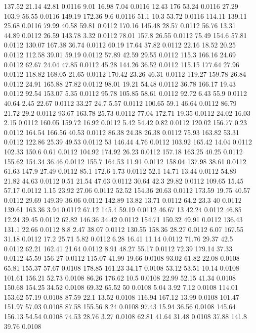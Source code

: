 137.52	21.14	42.81	0.0116
9.01	16.98	7.04	0.0116
12.43	176	53.24	0.0116
27.29	103.9	56.55	0.0116
149.19	172.36	9.6	0.0116
51.1	10.3	53.72	0.0116
114.11	139.11	25.68	0.0116
79.99	40.58	59.81	0.0112
170.16	145.48	28.57	0.0112
56.76	13.31	44.89	0.0112
26.59	143.78	3.32	0.0112
78.01	157.8	26.55	0.0112
75.49	154.6	57.81	0.0112
130.07	167.38	36.74	0.0112
60.19	17.64	37.82	0.0112
22.16	18.52	20.25	0.0112
112.58	39.01	59.19	0.0112
57.89	42.59	29.55	0.0112
115.3	166.16	24.69	0.0112
62.67	24.04	47.85	0.0112
45.28	144.26	36.52	0.0112
115.15	177.64	27.96	0.0112
118.82	168.05	21.65	0.0112
170.42	23.26	46.31	0.0112
119.27	159.78	26.84	0.0112
24.91	165.88	27.82	0.0112
98.01	19.21	54.48	0.0112
36.78	166.17	19.43	0.0112
92.54	153.07	5.35	0.0112
95.78	105.85	58.61	0.0112
92.72	6.43	55.9	0.0112
40.64	2.45	22.67	0.0112
33.27	24.7	5.57	0.0112
100.65	59.1	46.64	0.0112
86.79	21.72	29.2	0.0112
93.67	163.78	25.73	0.0112
77.04	172.71	19.35	0.0112
24.02	16.03	2.15	0.0112
160.05	159.72	16.92	0.0112
5.42	54.42	0.82	0.0112
120.02	156.77	0.23	0.0112
164.54	166.56	40.53	0.0112
86.38	24.38	26.38	0.0112
75.93	163.82	53.31	0.0112
122.86	25.39	49.53	0.0112
53	146.44	4.76	0.0112
103.92	165.42	14.04	0.0112
102.33	150.6	0.61	0.0112
104.92	174.92	26.23	0.0112
157.18	163.25	40.25	0.0112
155.62	154.34	36.46	0.0112
155.7	164.53	11.91	0.0112
158.04	137.98	38.61	0.0112
61.63	147.9	27.49	0.0112
85.1	172.6	1.73	0.0112
52.1	14.71	13.44	0.0112
54.89	21.82	44.63	0.0112
0.51	21.54	47.63	0.0112
30.64	42.3	29.82	0.0112
109.65	15.45	57.17	0.0112
1.15	23.92	27.06	0.0112
52.52	154.36	20.63	0.0112
173.59	19.75	40.57	0.0112
29.69	149.39	36.06	0.0112
142.89	13.82	13.71	0.0112
64.2	23.3	40	0.0112
139.61	163.36	3.94	0.0112
67.12	145.4	59.19	0.0112
46.67	13	42.24	0.0112
46.85	12.24	39.45	0.0112
62.82	146.36	34.42	0.0112
154.71	150.32	49.91	0.0112
136.43	131.1	22.66	0.0112
8.8	2.47	38.07	0.0112
130.55	158.36	28.27	0.0112
6.07	167.55	31.18	0.0112
17.2	25.71	5.82	0.0112
6.28	16.41	11.14	0.0112
71.76	29.37	42.5	0.0112
62.21	162.41	21.64	0.0112
8.91	48.27	55.17	0.0112
72.39	179.14	37.33	0.0112
45.59	156	27	0.0112
115.07	41.99	19.66	0.0108
93.02	61.82	22.08	0.0108
65.81	155.37	57.67	0.0108
178.85	161.23	34.17	0.0108
53.12	53.51	10.14	0.0108
101.61	156.21	52.73	0.0108
86.26	176.62	10.5	0.0108
22.99	52.15	41.34	0.0108
150.68	154.25	34.52	0.0108
69.32	65.52	50	0.0108
5.04	3.92	7.12	0.0108
114.01	153.62	57.19	0.0108
87.59	22.1	13.52	0.0108
116.94	167.12	13.99	0.0108
101.47	151.97	57.03	0.0108
87.58	155.56	8.24	0.0108
97.43	15.94	36.56	0.0108
145.64	156.13	54.54	0.0108
74.53	28.76	3.27	0.0108
62.81	41.64	31.48	0.0108
37.88	141.8	39.76	0.0108
